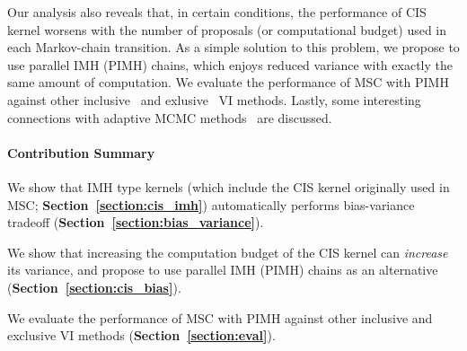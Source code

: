 Our analysis also reveals that, in certain conditions, the performance of CIS kernel worsens with the number of proposals (or computational budget) used in each Markov-chain transition.
As a simple solution to this problem, we propose to use parallel IMH (PIMH) chains, which enjoys reduced variance with exactly the same amount of computation.
We evaluate the performance of MSC with PIMH against other inclusive~\cite{DBLP:journals/corr/BornscheinB14, NEURIPS2020_b2070693} and exlusive~\cite{pmlr-v33-ranganath14, JMLR:v18:16-107} VI methods.
Lastly, some interesting connections with adaptive MCMC methods~\citep{10.1007/s11222-008-9110-y} are discussed.

\paragraph{Contribution Summary}
\begin{enumerate*}[label=\textbf{(\roman*)}]
\item We show that IMH type kernels (which include the CIS kernel originally used in MSC; \textbf{Section~\ref{section:cis_imh}}) automatically performs bias-variance tradeoff (\textbf{Section~\ref{section:bias_variance}}).
\item We show that increasing the computation budget of the CIS kernel can \textit{increase} its variance, and propose to use parallel IMH (PIMH) chains as an alternative (\textbf{Section~\ref{section:cis_bias}}).
\item We evaluate the performance of MSC with PIMH against other inclusive and exclusive VI methods (\textbf{Section~\ref{section:eval}}).
\end{enumerate*}




